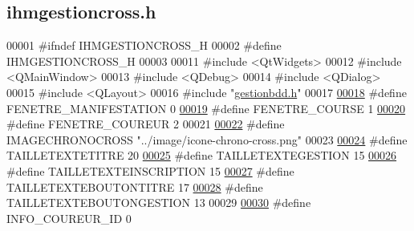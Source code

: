 \hypertarget{ihmgestioncross_8h_source}{}\subsection{ihmgestioncross.\+h}
\label{ihmgestioncross_8h_source}

\begin{DoxyCode}
00001 \textcolor{preprocessor}{#ifndef IHMGESTIONCROSS\_H}
00002 \textcolor{preprocessor}{#define IHMGESTIONCROSS\_H}
00003 
00011 \textcolor{preprocessor}{#include <QtWidgets>}
00012 \textcolor{preprocessor}{#include <QMainWindow>}
00013 \textcolor{preprocessor}{#include <QDebug>}
00014 \textcolor{preprocessor}{#include <QDialog>}
00015 \textcolor{preprocessor}{#include <QLayout>}
00016 \textcolor{preprocessor}{#include "\hyperlink{gestionbdd_8h}{gestionbdd.h}"}
00017 
\hyperlink{ihmgestioncross_8h_a7e5d9be785cb8f39015a5b28018e27ae}{00018} \textcolor{preprocessor}{#define FENETRE\_MANIFESTATION   0}
\hyperlink{ihmgestioncross_8h_a33016bbf4e13bffdd4306616fe9d6a0f}{00019} \textcolor{preprocessor}{#define FENETRE\_COURSE          1}
\hyperlink{ihmgestioncross_8h_ac2f4c2b58b7adbfe81ec7b9ee1293213}{00020} \textcolor{preprocessor}{#define FENETRE\_COUREUR         2}
00021 
\hyperlink{ihmgestioncross_8h_aa8bee638aa78f9b332485225ecc8e75e}{00022} \textcolor{preprocessor}{#define IMAGECHRONOCROSS "../image/icone-chrono-cross.png"}
00023 
\hyperlink{ihmgestioncross_8h_a36f0e5f0d9b4cfd8ae93abb3c8664bb8}{00024} \textcolor{preprocessor}{#define TAILLETEXTETITRE            20}
\hyperlink{ihmgestioncross_8h_a68398a635337dcf6f32e509fde02ae2e}{00025} \textcolor{preprocessor}{#define TAILLETEXTEGESTION          15}
\hyperlink{ihmgestioncross_8h_a03bd28b9d1b545df618f0ffa2bf27f03}{00026} \textcolor{preprocessor}{#define TAILLETEXTEINSCRIPTION      15}
\hyperlink{ihmgestioncross_8h_a562719681712f3dd8e5b5a158597e78b}{00027} \textcolor{preprocessor}{#define TAILLETEXTEBOUTONTITRE      17}
\hyperlink{ihmgestioncross_8h_a098c492b1e1752f08ae7fc2dcd763840}{00028} \textcolor{preprocessor}{#define TAILLETEXTEBOUTONGESTION    13}
00029 
\hyperlink{ihmgestioncross_8h_aac159105607582f38d1149244a24f017}{00030} \textcolor{preprocessor}{#define INFO\_COUREUR\_ID             0}

\end{DoxyCode}
